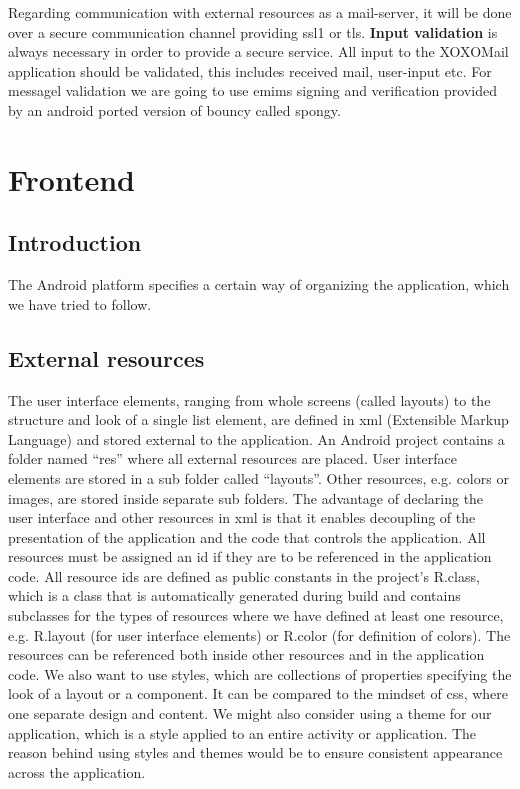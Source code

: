 Regarding communication with external resources as a mail-server, it will be done over a secure communication channel providing \gls{ssl1} or \gls{tls}. 
\newline
\newline
\textbf{Input validation} is always necessary in order to provide a secure service. All input to the XOXOMail application should be validated, this includes received mail, user-input etc. For messagel validation we are going to use \gls{emims} signing and verification provided by an android ported version of \gls{bouncy} called \gls{spongy}.

\section{Frontend}

\subsection{Introduction}
The Android platform specifies a certain way of organizing the application, which we have tried to follow.

\subsection{External resources}
The user interface elements, ranging from whole screens (called layouts) to the structure and look of a single list element, are defined in \gls{xml} (Extensible Markup Language) and stored external to the application. An Android project contains a folder named “res” where all external resources are placed. User interface elements are stored in a sub folder called “layouts”. Other resources, e.g. colors or images, are stored inside separate sub folders. The advantage of declaring the user interface and other resources in \gls{xml} is that it enables decoupling of the presentation of the application and the code that controls the application.
\newline
\newline
All resources must be assigned an \gls{id} if they are to be referenced in the application code. All resource \gls{id}s are defined as public constants in the project's R.class, which is a class that is automatically generated during build and contains subclasses for the types of resources where we have defined at least one resource, e.g. R.layout (for user interface elements) or R.color (for definition of colors). The resources can be referenced both inside other resources and in the application code.
\newline
\newline
We also want to use styles, which are collections of properties specifying the look of a layout or a component. It can be compared to the mindset of \gls{css}, where one separate design and content. We might also consider using a theme for our application, which is a style applied to an entire activity or application. The reason behind using styles and themes would be to ensure consistent appearance across the application. 

